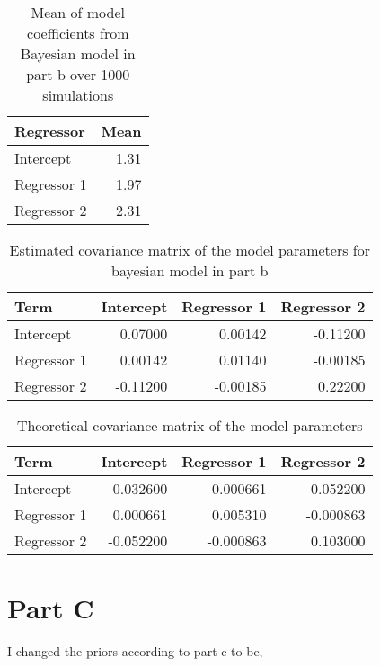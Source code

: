 \documentclass[]{book}
\begin{document}
\begin{table}

\caption{\label{tab:bayes-b-mean-coefs-q3}Mean of model coefficients from Bayesian model in part b over 1000 simulations}
\centering
\begin{tabular}[t]{lr}
\toprule
Regressor & Mean\\
\midrule
Intercept & 1.31\\
Regressor 1 & 1.97\\
Regressor 2 & 2.31\\
\bottomrule
\end{tabular}
\end{table}

\begin{table}

\caption{\label{tab:bayes-b-est-vcov-q3}Estimated covariance matrix of the model parameters for bayesian model in part b}
\centering
\begin{tabular}[t]{lrrr}
\toprule
Term & Intercept & Regressor 1 & Regressor 2\\
\midrule
Intercept & 0.07000 & 0.00142 & -0.11200\\
Regressor 1 & 0.00142 & 0.01140 & -0.00185\\
Regressor 2 & -0.11200 & -0.00185 & 0.22200\\
\bottomrule
\end{tabular}
\end{table}

\begin{table}

\caption{\label{tab:theory-vcov-b-q3}Theoretical covariance matrix of the model parameters}
\centering
\begin{tabular}[t]{lrrr}
\toprule
Term & Intercept & Regressor 1 & Regressor 2\\
\midrule
Intercept & 0.032600 & 0.000661 & -0.052200\\
Regressor 1 & 0.000661 & 0.005310 & -0.000863\\
Regressor 2 & -0.052200 & -0.000863 & 0.103000\\
\bottomrule
\end{tabular}
\end{table}

\hypertarget{part-c-2}{%
\section{Part C}\label{part-c-2}}

I changed the priors according to part c to be,
\end{document}
